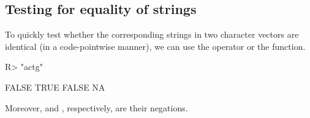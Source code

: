 \documentclass[nojss]{jss}\usepackage[]{graphicx}\usepackage[]{color}
\begin{document}
\subsection{Testing for equality of strings}



To quickly test whether the corresponding strings in two character vectors
are identical (in a code-pointwise manner), we can use the 
operator or the  function.

\begin{Schunk}
\begin{Sinput}
R> "actg" %s===% c("ACTG", "actg", "act", NA)  # recycling rule
\end{Sinput}
\begin{Soutput}
[1] FALSE  TRUE FALSE    NA
\end{Soutput}
\end{Schunk}

Moreover,  and , respectively,
are their negations.
\end{document}

